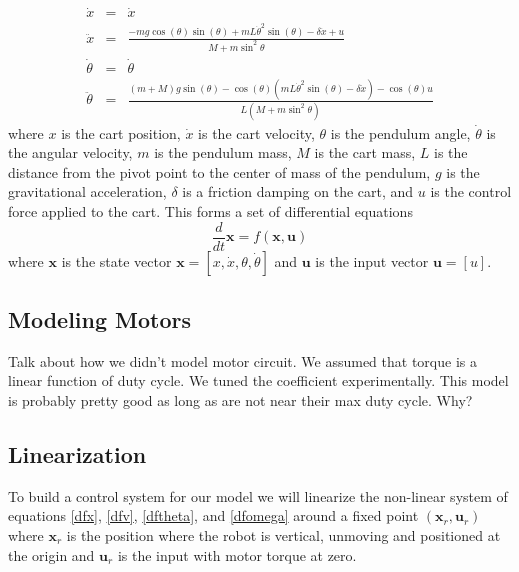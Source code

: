 \documentclass[]{article}
\newcommand{\bx}{\boldsymbol{x}}
\newcommand{\bu}{\boldsymbol{u}}
\begin{document}
\begin{eqnarray}
	\dot{x} & = & \dot{x} \label{dfx} \\ 
	\ddot{x}          & = & \frac{-mg \cos(\theta)\sin(\theta) + mL{\dot{\theta}}^2 \sin(\theta)-\delta \dot{x}+u }{M+m\sin^2\theta}  \label{dfv} \\
	\dot{\theta}  &= & \dot{\theta} \label{dftheta} \\	
	\ddot{\theta}  &= & \frac{(m+M)g\sin(\theta)-\cos(\theta)(mL{\dot{\theta}}^2\sin(\theta)-\delta \dot{x})-\cos(\theta)u}{L(M+m\sin^2\theta)} \label{dfomega}
\end{eqnarray}
where $x$ is the cart position, $\dot{x}$ is the cart velocity, $\theta$ is the pendulum angle, $\dot{\theta}$ is the angular velocity, $m$ is the pendulum mass, $M$ is the cart mass, $L$ is the distance from the pivot point to the center of mass of the pendulum, $g$ is the gravitational acceleration, $\delta$ is a friction damping on the cart, and $u$ is the control force applied to the cart. This forms a set of differential equations 
\begin{equation}
	\frac{d}{dt} \bx = f(\bx, \bu) \label{dfdx}
\end{equation}
where $\bx$ is the state vector $\bx = [x, \dot{x}, \theta, \dot{\theta}]$ and $\bu$ is the input vector $\bu=[u]$.

\subsection*{Modeling Motors}
Talk about how we didn't model motor circuit. We assumed that torque is a linear function of duty cycle.  We tuned the coefficient experimentally.  This model is probably pretty good as long as are not near their max duty cycle. Why?

\subsection*{Linearization}
To build a control system for our model we will linearize the non-linear system of equations \eqref{dfx}, \eqref{dfv}, \eqref{dftheta}, and \eqref{dfomega} around a fixed point $(\bx_r, \bu_r)$  where $\bx_r$ is the position where the robot is vertical, unmoving and positioned at the origin and $\bu_r$ is the input with motor torque at zero.
\end{document}
